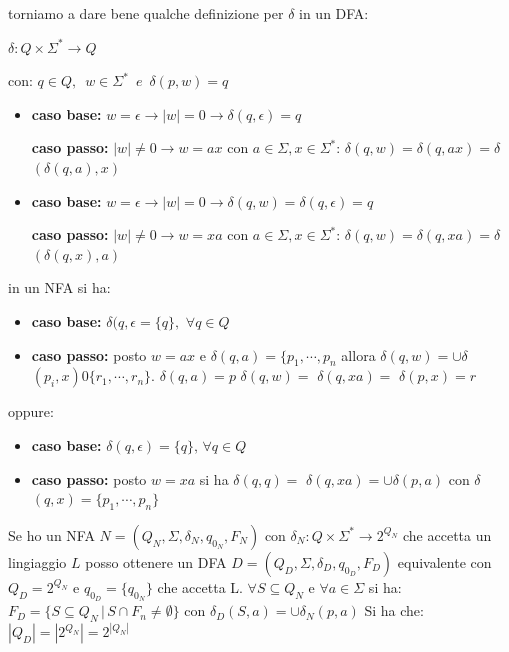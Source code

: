torniamo a dare bene qualche definizione per {$\delta$} in un DFA:
\begin{center}
	$\delta:Q\times \Sigma^* \to Q$
\end{center}
con: $q\in Q,\,\,\, w\in \Sigma^*\,\,\,e\,\,\,${$\delta$}$(p,w)=q$
\begin{itemize}
	\item
	      \textbf{caso base:} $w=\epsilon\to |w|=0\to${$\delta$}$(q,\epsilon)=q$

	      \textbf{caso passo:} $|w|\neq0\to w=ax$ con $a\in \Sigma,x\in \Sigma^*$:
	      {$\delta$}$(q,w)=${$\delta$}$(q,ax)=${$\delta$} $(\delta(q,a),x)$
	\item
	      \textbf{caso base:} $w=\epsilon\to |w|=0\to \delta(q,w)=\delta(q,\epsilon)=q$

	      \textbf{caso passo:} $|w|\neq0\to w=xa$ con $a\in \Sigma,x\in \Sigma^*$:
	      {$\delta$}$(q,w)=${$\delta$}$(q,xa)=${$\delta$} $(\delta(q,x),a)$
\end{itemize}
in un NFA si ha:
\begin{itemize}
	\item \textbf{caso base:}  {$\delta$}$(q,\epsilon=\{q\},\,\,\forall q\in Q$
	\item \textbf{caso passo:} posto $w=ax$ e {$\delta$}$(q,a)=\{p_1,\cdots,p_n$ allora {$\delta$}$(q,w)=\cup${$\delta$}$(p_i, x)0\{r_1,\cdots,r_n\}$.
		      {$\delta$}$(q,a)=p$
	      {$\delta$}$(q,w)=$ {$\delta$}$(q,xa)=$ {$\delta$}$(p,x)=r$
\end{itemize}
oppure:
\begin{itemize}
	\item \textbf{caso base:}  {$\delta$}$(q,\epsilon)=\{q\},\,\forall q\in Q$
	\item \textbf{caso passo:} posto $w=xa$ si ha  {$\delta$}$(q,q)=$ {$\delta$}$(q,xa)=\cup \delta(p,a)$ con  {$\delta$}$(q,x)=\{p_1,\cdots,p_n\}$
\end{itemize}
Se ho un NFA $N=(Q_N, \Sigma, \delta_N, q_{0_N}, F_N)$ con $\delta_N: Q\times\Sigma^*\to 2^{Q_N}$ che accetta un lingiaggio $L$ posso ottenere un DFA $D=(Q_D, \Sigma, \delta_D, q_{0_D}, F_D)$ equivalente con $Q_D=2^{Q_N}$  e $q_{0_D}=\{q_{0_N}\}$ che accetta L.
$\forall S\subseteq Q_N$ e $\forall a\in \Sigma$ si ha:
$F_D=\{S\subseteq Q_N\,|\, S\cap F_n\neq \emptyset\}$
con $\delta_D(S,a)=\cup \delta_N(p,a)$
Si ha che:
$|Q_D|=|2^{Q_N}|=2^{|Q_N|}$
